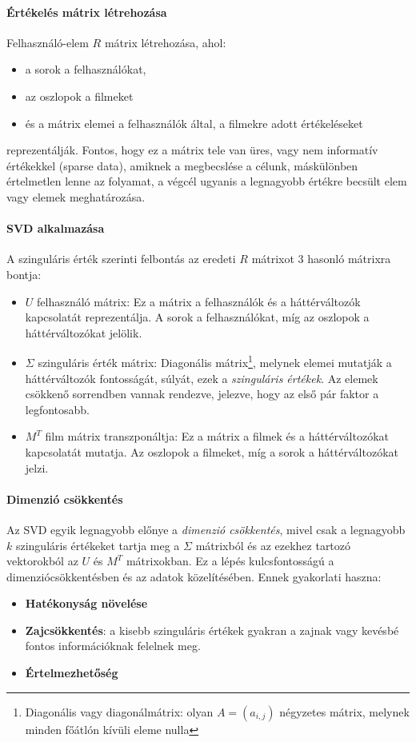 \documentclass[
]{thesis-ekf}
\theoremstyle{definition}
\theoremstyle{remark}
\begin{document}
\paragraph{Értékelés mátrix létrehozása}
Felhasználó-elem $R$ mátrix létrehozása, ahol:
\begin{itemize}
	\item a sorok a felhasználókat,
	\item az oszlopok a filmeket
	\item és a mátrix elemei a felhasználók által, a filmekre adott értékeléseket 
\end{itemize} reprezentálják.
Fontos, hogy ez a mátrix tele van üres, vagy nem informatív értékekkel (sparse data), amiknek a megbecslése a célunk, máskülönben értelmetlen lenne az folyamat, a végcél ugyanis a legnagyobb értékre becsült elem vagy elemek meghatározása.

\paragraph{SVD alkalmazása}
A szinguláris érték szerinti felbontás az eredeti $R$ mátrixot 3 hasonló mátrixra bontja:
\begin{itemize}
	\item $U$ felhasználó mátrix: Ez a mátrix a felhasználók és a háttérváltozók kapcsolatát reprezentálja. A sorok a felhasználókat, míg az oszlopok a háttérváltozókat jelölik.
	
	\item $\Sigma$ szinguláris érték mátrix: Diagonális mátrix\footnote{Diagonális vagy diagonálmátrix: olyan $A=(a_{i,j})$ négyzetes mátrix, melynek minden főátlón kívüli eleme nulla\cite{wiki-diagonalis-matrix}}, melynek elemei mutatják a háttérváltozók fontosságát, súlyát, ezek a \emph{szinguláris értékek}. Az elemek csökkenő sorrendben vannak rendezve, jelezve, hogy az első pár faktor a legfontosabb.
	
	\item $M^{T}$ film mátrix transzponáltja:  Ez a mátrix a filmek és a háttérváltozókat kapcsolatát mutatja. Az oszlopok a filmeket, míg a sorok a háttérváltozókat jelzi.
\end{itemize}

\paragraph{Dimenzió csökkentés}
Az SVD egyik legnagyobb előnye a \emph{dimenzió csökkentés}, mivel csak a legnagyobb $k$ szinguláris értékeket tartja meg a $\Sigma$ mátrixból és az ezekhez tartozó vektorokból az $U$ és $M^{T}$ mátrixokban. Ez a lépés kulcsfontosságú a dimenziócsökkentésben és az adatok közelítésében. Ennek gyakorlati haszna:
\begin{itemize}
	\item \textbf{Hatékonyság növelése}
	\item \textbf{Zajcsökkentés}: a kisebb szinguláris értékek gyakran a zajnak vagy kevésbé fontos információknak felelnek meg.
	\item \textbf{Értelmezhetőség}
\end{itemize}
\end{document}
